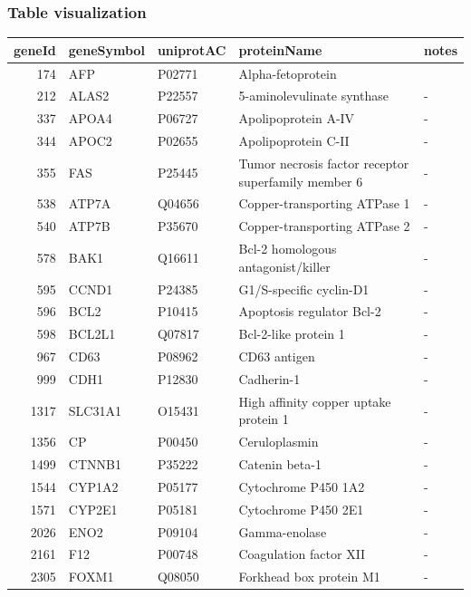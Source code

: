 \documentclass[
]{article}
\begin{document}
\hypertarget{table-visualization}{%
\subsubsection{Table visualization}\label{table-visualization}}

\begin{table}[H]
\centering
\begin{tabular}[t]{r|l|l|l|l}
\hline
geneId & geneSymbol & uniprotAC & proteinName & notes\\
\hline
174 & AFP & P02771 & Alpha-fetoprotein & \\
\hline
212 & ALAS2 & P22557 & 5-aminolevulinate synthase & -\\
\hline
337 & APOA4 & P06727 & Apolipoprotein A-IV & -\\
\hline
344 & APOC2 & P02655 & Apolipoprotein C-II & -\\
\hline
355 & FAS & P25445 & Tumor necrosis factor receptor superfamily member 6 & -\\
\hline
538 & ATP7A & Q04656 & Copper-transporting ATPase 1 & -\\
\hline
540 & ATP7B & P35670 & Copper-transporting ATPase 2 & -\\
\hline
578 & BAK1 & Q16611 & Bcl-2 homologous antagonist/killer & -\\
\hline
595 & CCND1 & P24385 & G1/S-specific cyclin-D1 & -\\
\hline
596 & BCL2 & P10415 & Apoptosis regulator Bcl-2 & -\\
\hline
598 & BCL2L1 & Q07817 & Bcl-2-like protein 1 & -\\
\hline
967 & CD63 & P08962 & CD63 antigen & -\\
\hline
999 & CDH1 & P12830 & Cadherin-1 & -\\
\hline
1317 & SLC31A1 & O15431 & High affinity copper uptake protein 1 & -\\
\hline
1356 & CP & P00450 & Ceruloplasmin & -\\
\hline
1499 & CTNNB1 & P35222 & Catenin beta-1 & -\\
\hline
1544 & CYP1A2 & P05177 & Cytochrome P450 1A2 & -\\
\hline
1571 & CYP2E1 & P05181 & Cytochrome P450 2E1 & -\\
\hline
2026 & ENO2 & P09104 & Gamma-enolase & -\\
\hline
2161 & F12 & P00748 & Coagulation factor XII & -\\
\hline
2305 & FOXM1 & Q08050 & Forkhead box protein M1 & -\\

\end{tabular}
\end{table}
\end{document}
